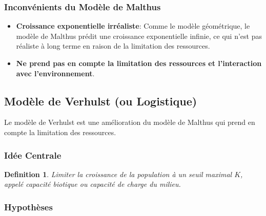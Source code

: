 \documentclass{article}
\newtheorem{definition}{Definition}
\begin{document}
\subsubsection{Inconvénients du Modèle de Malthus}

\begin{itemize}
    \item \textbf{Croissance exponentielle irréaliste}: Comme le modèle géométrique, le modèle de Malthus prédit une croissance exponentielle infinie, ce qui n'est pas réaliste à long terme en raison de la limitation des ressources.
    \item \textbf{Ne prend pas en compte la limitation des ressources et l'interaction avec l'environnement}.
\end{itemize}

\subsection{Modèle de Verhulst (ou Logistique)}

Le modèle de Verhulst est une amélioration du modèle de Malthus qui prend en compte la limitation des ressources.

\subsubsection{Idée Centrale}
\begin{definition}
Limiter la croissance de la population à un seuil maximal $K$, appelé \textit{capacité biotique} ou \textit{capacité de charge} du milieu.
\end{definition}

\subsubsection{Hypothèses}
\end{document}

